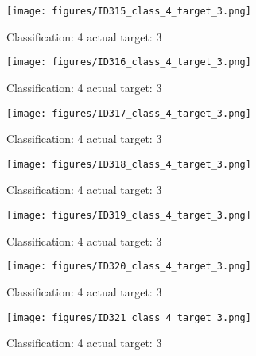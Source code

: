 \begin{figure}[h!]
\begin{center}
\texttt{[image: figures/ID315\_class\_4\_target\_3.png]}
\end{center}
\caption{ Classification: 4 actual target: 3}
\label{fig:ID315_class_4_target_3}
\end{figure}
\begin{figure}[h!]
\begin{center}
\texttt{[image: figures/ID316\_class\_4\_target\_3.png]}
\end{center}
\caption{ Classification: 4 actual target: 3}
\label{fig:ID316_class_4_target_3}
\end{figure}
\begin{figure}[h!]
\begin{center}
\texttt{[image: figures/ID317\_class\_4\_target\_3.png]}
\end{center}
\caption{ Classification: 4 actual target: 3}
\label{fig:ID317_class_4_target_3}
\end{figure}
\begin{figure}[h!]
\begin{center}
\texttt{[image: figures/ID318\_class\_4\_target\_3.png]}
\end{center}
\caption{ Classification: 4 actual target: 3}
\label{fig:ID318_class_4_target_3}
\end{figure}
\begin{figure}[h!]
\begin{center}
\texttt{[image: figures/ID319\_class\_4\_target\_3.png]}
\end{center}
\caption{ Classification: 4 actual target: 3}
\label{fig:ID319_class_4_target_3}
\end{figure}
\begin{figure}[h!]
\begin{center}
\texttt{[image: figures/ID320\_class\_4\_target\_3.png]}
\end{center}
\caption{ Classification: 4 actual target: 3}
\label{fig:ID320_class_4_target_3}
\end{figure}
\begin{figure}[h!]
\begin{center}
\texttt{[image: figures/ID321\_class\_4\_target\_3.png]}
\end{center}
\caption{ Classification: 4 actual target: 3}
\label{fig:ID321_class_4_target_3}
\end{figure}
